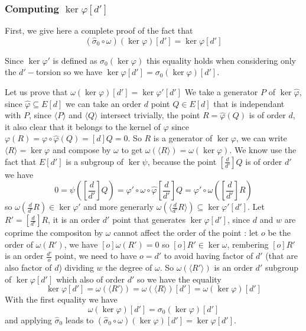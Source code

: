 \documentclass[12pt,a4paper]{article}
\begin{document}
			\subsubsection{Computing $\ker\varphi[d']$}

			First, we give here a complete proof of the fact that \[
				(\widehat\sigma_0\circ\omega)(\ker\varphi)[d']=\ker\varphi[d']
			\] 

			Since $\ker\varphi'$ is defined as $\sigma_0(\ker\varphi)$ this equality holds when considering only
			the $d'-$torsion so we have $\ker\varphi[d']=\sigma_0(\ker\varphi)[d']$. 

			Let us prove that $\omega(\ker\varphi)[d']=\ker\varphi'[d']$
			We take a generator $P$ of $\ker\widehat\varphi$, since $\widehat\varphi\subseteq E[d]$ we can take
			an order $d$ point $Q\in E[d]$ that is independant with $P$, since $\langle P\rangle$ and  $\langle
			Q \rangle$ intersect trivially, the point  $R=\widehat\varphi(Q)$ is of order $d$, it also clear that
			it belongs to the kernel of  $\varphi$ since $\varphi(R)=\varphi\circ\widehat\varphi(Q)=[d]Q=0$.
			So $R$ is a generator of $\ker\varphi$, we can write $\langle R\rangle = \ker\varphi$ and
			compose by  $\omega$ to get $\omega(\langle R\rangle)=\omega(\ker\varphi)$.
			We know use the fact that $E[d']$ is a subgroup of $\ker\psi$, because the point $[\frac{d}{d'}]Q$
			is of order $d'$ we have
			\[
				0=\psi([\frac{d}{d'}]Q) = \varphi'\circ\omega\circ \widehat\varphi[\frac{d}{d'}]Q
				= \varphi'\circ\omega([\frac{d}{d'}]R)
			\] so $\omega(\frac{d}{d'}R)\in\ker\varphi'$ and more generarly $\omega(\langle
			\frac{d}{d'}R\rangle)\subseteq\ker\varphi'[d']$.
			Let $R'=[\frac{d}{d'}]R$, it is an order $d'$ point that generates $\ker\varphi[d']$, since $d$ and
			$w$ are coprime the compositon by $\omega$ cannot affect the order of the point : let $o$ be the
			order of $\omega(R')$, we have  $[o]\omega(R')=0$ so $[o]R'\in\ker\omega$, rembering $[o]R'$ is an
			order $\frac{d'}{o}$ point, we need to have $o=d'$ to avoid having factor of $d'$ (that are also
			factor of $d$) dividing $w$ the degree of $\omega$. So $\omega(\langle R'\rangle)$ is an order $d'$ 
			subgroup of $\ker\varphi[d']$ which also of order  $d'$ so we have the equality \[
				\ker\varphi[d']=\omega(\langle R'\rangle)=\omega(\langle R\rangle)[d']=\omega(\ker\varphi)[d']
			\] 
			With the first equality we have \[
				\omega(\ker\varphi)[d'] = \sigma_0(\ker\varphi)[d']
			\] 
			and applying $\widehat\sigma_0$ leads to
			$(\widehat\sigma_0\circ\omega)(\ker\varphi)[d']=\ker\varphi[d']$.
			
\end{document}
